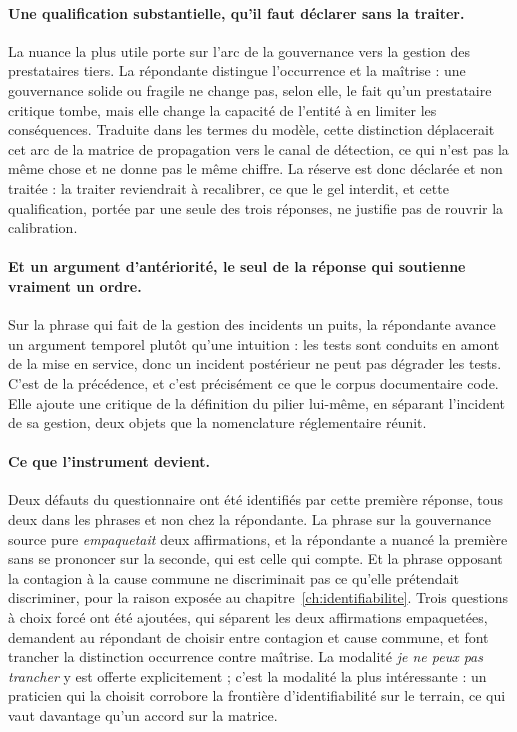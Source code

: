 \paragraph{Une qualification substantielle, qu'il faut déclarer sans la traiter.} La nuance la
plus utile porte sur l'arc de la gouvernance vers la gestion des prestataires tiers. La
répondante distingue l'occurrence et la maîtrise : une gouvernance solide ou
fragile ne change pas, selon elle, le fait qu'un prestataire critique tombe, mais elle change
la capacité de l'entité à en limiter les conséquences. Traduite dans les termes du modèle,
cette distinction déplacerait cet arc de la matrice de propagation vers le canal de détection,
ce qui n'est pas la même chose et ne donne pas le même chiffre. La réserve est donc
déclarée et non traitée : la traiter reviendrait à recalibrer, ce que le gel interdit,
et cette qualification, portée par une seule des trois réponses, ne justifie pas de rouvrir
la calibration.

\paragraph{Et un argument d'antériorité, le seul de la réponse qui soutienne vraiment un
ordre.} Sur la phrase qui fait de la gestion des incidents un puits, la répondante avance un
argument temporel plutôt qu'une intuition : les tests sont conduits en amont de la mise en
service, donc un incident postérieur ne peut pas dégrader les tests. C'est de la précédence, et
c'est précisément ce que le corpus documentaire code. Elle ajoute une critique de la définition
du pilier lui-même, en séparant l'incident de sa gestion, deux objets que la nomenclature
réglementaire réunit.

\paragraph{Ce que l'instrument devient.} Deux défauts du questionnaire ont été identifiés par
cette première réponse, tous deux dans les phrases et non chez la répondante. La phrase sur la
gouvernance source pure \emph{empaquetait} deux affirmations, et la répondante a nuancé la
première sans se prononcer sur la seconde, qui est celle qui compte. Et la phrase opposant la
contagion à la cause commune ne discriminait pas ce qu'elle prétendait discriminer, pour la
raison exposée au chapitre~\ref{ch:identifiabilite}. Trois questions à choix forcé ont été
ajoutées,
qui séparent les deux affirmations empaquetées, demandent au répondant de choisir entre
contagion et cause commune, et font trancher la distinction occurrence contre maîtrise. La
modalité \emph{je ne peux pas trancher} y est offerte explicitement ; c'est la modalité la plus
intéressante : un praticien qui la choisit corrobore la frontière d'identifiabilité sur le
terrain, ce qui vaut davantage qu'un accord sur la matrice.

